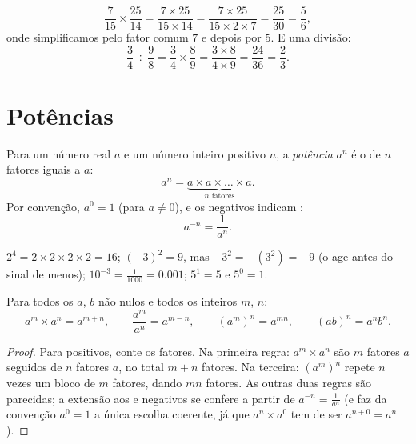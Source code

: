 \begin{example}\label{ex:g9:fractions:mult}
\[
\frac{7}{15} \times \frac{25}{14}
= \frac{7 \times 25}{15 \times 14}
= \frac{7 \times 25}{15 \times 2 \times 7}
= \frac{25}{30} = \frac56,
\]
onde simplificamos pelo fator comum $7$ e depois por $5$. E uma
divisão:
\[
\frac{3}{4} \div \frac{9}{8}
= \frac34 \times \frac89
= \frac{3 \times 8}{4 \times 9}
= \frac{24}{36} = \frac23 .
\]
\end{example}

\section{Potências}

\begin{definition}[Potência]\label{def:g9:fractions:power}
Para um número real $a$ e um número inteiro positivo $n$, a
\emph{potência} $a^n$ é o  de $n$ fatores
iguais a $a$:
\[
a^n = \underbrace{a \times a \times \dots \times a}_{n \text{ fatores}} .
\]
Por convenção, $a^0 = 1$ (para $a \neq 0$), e os  negativos
indicam :
\[
a^{-n} = \frac{1}{a^n}.
\]
\end{definition}

\begin{example}
$2^4 = 2 \times 2 \times 2 \times 2 = 16$; \quad
$(-3)^2 = 9$, mas $-3^2 = -(3^2) = -9$ (o  age antes do sinal
de menos); \quad $10^{-3} = \frac{1}{1000} = 0.001$; \quad
$5^1 = 5$ e $5^0 = 1$.
\end{example}

\begin{theorem}\label{thm:g9:fractions:rules}
Para todos os $a$, $b$ não nulos e todos os inteiros $m$, $n$:
\[
a^m \times a^n = a^{m+n},
\qquad
\frac{a^m}{a^n} = a^{m-n},
\qquad
\left(a^m\right)^n = a^{mn},
\qquad
(ab)^n = a^n b^n .
\]
\end{theorem}

\begin{proof}
Para  positivos, conte os fatores. Na primeira regra:
$a^m \times a^n$ são $m$ fatores $a$ seguidos de $n$ fatores $a$, no
total $m + n$ fatores. Na terceira: $\left(a^m\right)^n$ repete $n$
vezes um bloco de $m$ fatores, dando $mn$ fatores. As outras duas
regras são parecidas; a extensão aos   e negativos se
confere a partir de $a^{-n} = \frac{1}{a^n}$ (e faz da convenção
$a^0 = 1$ a única escolha coerente, já que $a^n \times a^0$ tem de ser
$a^{n+0} = a^n$).
\end{proof}

